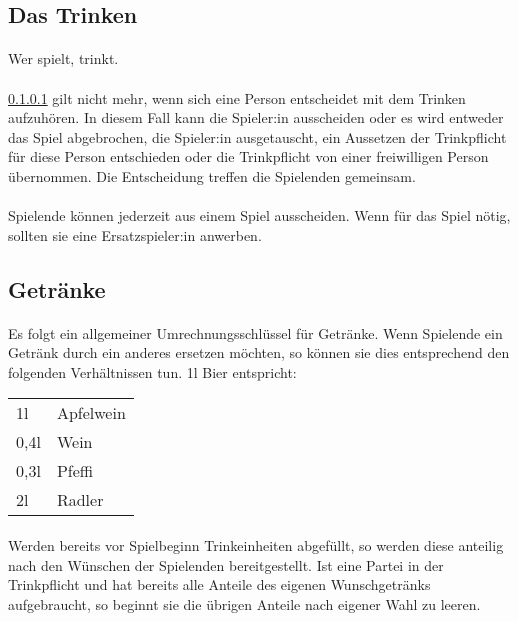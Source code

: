 \subsection{Das Trinken}
\paragraph{}\label{Allgemeine_Regelungen:Trinken:Trink}
Wer spielt, trinkt.

\paragraph{}
\ref{Allgemeine_Regelungen:Trinken:Trink} gilt nicht mehr, wenn sich eine Person entscheidet mit dem Trinken aufzuhören.
In diesem Fall kann die Spieler:in ausscheiden oder es wird entweder das Spiel abgebrochen, die Spieler:in ausgetauscht, ein Aussetzen der Trinkpflicht für diese Person entschieden oder die Trinkpflicht von einer freiwilligen Person übernommen.
Die Entscheidung treffen die Spielenden gemeinsam.

\paragraph{}
Spielende können jederzeit aus einem Spiel ausscheiden. Wenn für das Spiel nötig, sollten sie eine Ersatzspieler:in anwerben.

\subsection{Getränke}\label{Allgemeine_Regelungen:Getränke}
\paragraph{} \label{Allgemeine_Regelungen:Getränke:Umrechnung}
Es folgt ein allgemeiner Umrechnungsschlüssel für Getränke.
Wenn Spielende ein Getränk durch ein anderes ersetzen möchten, so können sie dies entsprechend den folgenden Verhältnissen tun.
1l Bier entspricht:

\begin{tabular}{l l}
    1l      & Apfelwein\\
    0,4l    & Wein \\
    0,3l    & Pfeffi\\
    2l      & Radler
\end{tabular}

\paragraph{} \label{Allgemeine_Regelungen:Getränke:Abfüllen}
Werden bereits vor Spielbeginn Trinkeinheiten abgefüllt, so werden diese anteilig nach den Wünschen der Spielenden bereitgestellt.
Ist eine Partei in der Trinkpflicht und hat bereits alle Anteile des eigenen Wunschgetränks aufgebraucht, so beginnt sie die übrigen Anteile nach eigener Wahl zu leeren.

